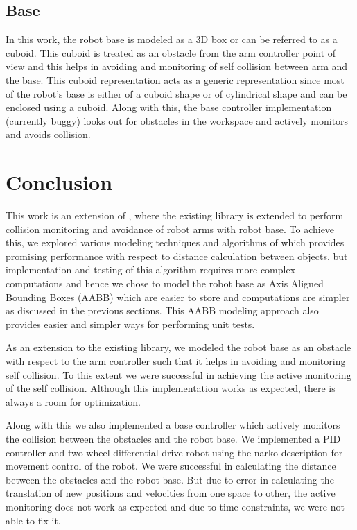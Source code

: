 \documentclass[a4paper, 11.5pt, conference]{ieeeconf}      %
\begin{document}
\subsection{Base}
In this work, the robot base is modeled as a 3D box or can be referred to as a cuboid. This cuboid is treated as an obstacle from the arm controller point of view and this helps in avoiding and monitoring of self collision between arm and the base. This cuboid representation acts as a generic representation since most of the robot's base is either of a cuboid shape or of cylindrical shape and can be enclosed using a cuboid. Along with this, the base controller implementation (currently buggy) looks out for obstacles in the workspace and actively monitors and avoids collision.

\section{Conclusion}
This work is an extension of \cite{sdpss20}, where the existing library is extended to perform collision monitoring and avoidance of robot arms with robot base. To achieve this, we explored various modeling techniques and algorithms of which \cite{GJK} provides promising performance with respect to distance calculation between objects, but implementation and testing of this algorithm requires more complex computations and hence we chose to model the robot base as Axis Aligned Bounding Boxes (AABB) \cite{3ddet} which are easier to store and computations are simpler as discussed in the previous sections. This AABB modeling approach also provides easier and simpler ways for performing unit tests.

As an extension to the existing library, we modeled the robot base as an obstacle with respect to the arm controller such that it helps in avoiding and monitoring self collision. To this extent we were successful in achieving the active monitoring of the self collision. Although this implementation works as expected, there is always a room for optimization.

Along with this we also implemented a base controller which actively monitors the collision between the obstacles and the robot base. We implemented a PID controller and two wheel differential drive robot using the narko description for movement control of the robot. We were successful in calculating the distance between the obstacles and the robot base. But due to error in calculating the translation of new positions and velocities from one space to other, the active monitoring does not work as expected and due to time constraints, we were not able to fix it.
\end{document}
